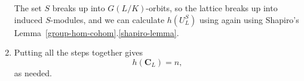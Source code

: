 \begin{enumerate}
The set $S$ breaks up into $G(L/K)$-orbits, so the lattice breaks up into induced $S$-modules, and we can calculate $h(U_L^S)$ using again using Shapiro's Lemma~\ref{group-hom-cohom}.\ref{shapiro-lemma}.
\item
Putting all the steps together gives
\[
h(\mathbf C_L)=n,
\]
as needed.
%
\end{enumerate}
